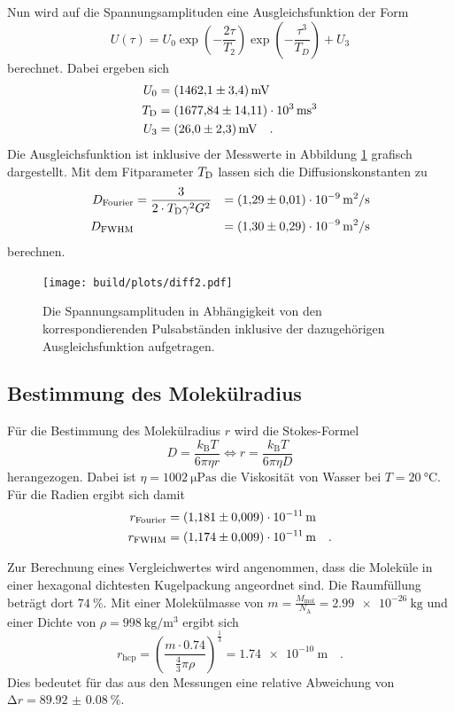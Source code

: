 \noindent 
Nun wird auf die Spannungsamplituden eine Ausgleichsfunktion der Form 
\begin{equation*}
  U\left(\tau\right) = U_0 \exp{\left(-\frac{2\tau}{T_2}\right)} \exp{\left(-\frac{\tau^3}{T_D}\right)} + U_3
\end{equation*}
berechnet. Dabei ergeben sich
\begin{align*}
  U_0 &= \SI{1462.1(34)}{\milli\volt}\\
  T_\t{D} &= \SI{1677.84(1411)e3}{\milli\second^3}\\
  U_3 &= \SI{26.0(23)}{\milli\volt} \quad .
\end{align*}
Die Ausgleichsfunktion ist inklusive der Messwerte in Abbildung \ref{img:diff2} grafisch dargestellt.
Mit dem Fitparameter $T_\t{D}$ lassen sich die Diffusionskonstanten zu 
\begin{align*}
  D_\t{Fourier}&  = \frac{3}{2\cdot T_\t{D} \gamma^2 G^2} &= \SI{1.29(1)e-9}{\metre^2\per\second}\\
  D_\t{FWHM}&  &= \SI{ 1.30(29)e-9}{\metre^2\per\second}
\end{align*}
berechnen. 


\begin{figure}[H]
  \centering
  \texttt{[image: build/plots/diff2.pdf]}
  \caption{Die Spannungsamplituden in Abhängigkeit von den korrespondierenden Pulsabständen inklusive der dazugehörigen Ausgleichsfunktion aufgetragen. }
\label{img:diff2}
\end{figure}



\subsection{Bestimmung des Molekülradius}


\noindent
Für die Bestimmung des Molekülradius $r$ wird die Stokes-Formel 
\begin{equation*}
  D = \frac{k_\text{B}T}{6\pi\eta r} \iff r = \frac{k_\text{B}T}{6 \pi\eta D}
\end{equation*}
herangezogen. Dabei ist $\eta = \SI{1002}{\micro\pascal\second} $\cite{visko} die Viskosität von Wasser bei $T= \SI{20}{\degreeCelsius}$.
Für die Radien ergibt sich damit
\begin{align*}
  r_\t{Fourier} &= \SI{1.181(9)e-11}{\metre} \\
  r_\t{FWHM} &= \SI{1.174(9)e-11}{\metre} \quad .
  \end{align*}

\noindent
Zur Berechnung eines Vergleichwertes wird angenommen, dass die Moleküle in einer hexagonal dichtesten Kugelpackung angeordnet 
sind. Die Raumfüllung beträgt dort $\SI{74}{\percent}$. Mit einer Molekülmasse von $m = \frac{M_\text{mol}}{N_\text{A}} = \SI{2.99e-26}{\kilo\gram}$
und einer Dichte von $\rho=\SI{998}{\kilo\gram\per\metre^3}$\cite{visko} ergibt sich
\begin{equation*}
  r_\text{hcp} = \left(\frac{m\cdot 0.74}{\frac{4}{3}\pi\rho}\right)^{\frac{1}{3}} = \SI{1.74e-10}{\metre} \quad .
\end{equation*}
Dies bedeutet für das aus den Messungen eine relative Abweichung von $\increment r = \SI{89.92(8)}{\percent}$.

